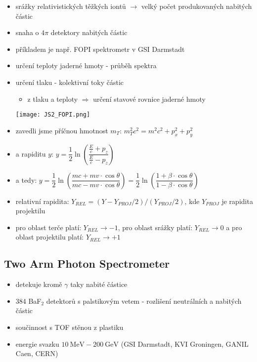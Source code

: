 \documentclass[../../main.tex]{subfiles}
\begin{document}
\begin{itemize}
	\item srážky relativistických těžkých iontů $\rightarrow$ velký počet produkovaných nabitých částic
	\item snaha o $ 4 \pi$ detektory nabitých částic
	\item příkladem je např. FOPI spektrometr v GSI Darmstadt
	\item určení teploty jaderné hmoty - průběh spektra
	\item určení tlaku - kolektivní toky částic 
	\begin{itemize}
		\item z tlaku a teploty $\Rightarrow$ určení stavové rovnice jaderné hmoty
	\end{itemize}

\begin{center}
	\texttt{[image: JS2\_FOPI.png]}
\end{center}

   \item zavedli jsme příčnou hmotnost $m_T$: $m_{T}^2 c^2 = m^2 c^2 + p_{x}^2 + p_{y}^2$
   \item a rapiditu $y$: $y = \dfrac{1}{2} \ln \left( \dfrac{\frac{E}{c} + p_z}{\frac{E}{c} - p_z} \right)$
   \item a tedy: $y = \dfrac{1}{2} \ln \left( \dfrac{mc + mv \cdotp \cos \theta}{mc - mv \cdotp \cos \theta}\right) = \dfrac{1}{2} \ln \left( \dfrac{1 + \beta \cdotp \cos \theta}{1 - \beta \cdotp \cos \theta}\right) $
   \item relativní rapidita: $Y_{REL} = (Y - Y_{PROJ}/2) /(Y_{PROJ}/2)$, kde $Y_{PROJ}$ je rapidita projektilu
   \item pro oblast terče platí: $Y_{REL} \rightarrow -1$, pro oblast srážky platí: $Y_{REL} \rightarrow 0$ a pro oblast projektilu platí: $Y_{REL} \rightarrow +1$
\end{itemize}

\subsection{Two Arm Photon Spectrometer}

\begin{itemize}
	\item detekuje kromě $\gamma$ taky nabité částice
	\item 384 BaF$_2$ detektorů s palstikovým vetem - rozlišení neutrálních a nabitých částic 
	\item součinnost s TOF stěnou z plastiku
	\item energie svazku $10 ~\mathrm{MeV} - 200 ~\mathrm{GeV}$ (GSI Darmstadt, KVI Groningen, GANIL Caen, CERN)
\end{itemize}
\end{document}
